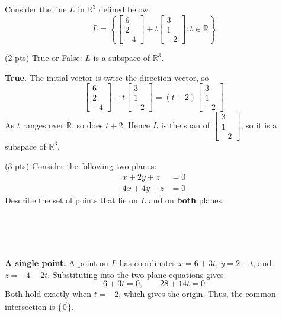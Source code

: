 \documentclass[11pt,twoside]{article}
\begin{document}
\begin{prob}[(5 pts)]
Consider the line $L$ in $\mathbb R^3$ defined below.
\[
L=\left\{\begin{bmatrix}6\\2\\-4\end{bmatrix}+t\begin{bmatrix}3\\1\\-2\end{bmatrix}:t\in\mathbb R\right\}
\]
\begin{subprob}(2 pts) True or False: $L$ is a subspace of $\mathbb R^3$.

\quad{}


\begin{solution}
\textbf{True.} The initial vector is twice the direction vector, so
\[
\begin{bmatrix}6\\2\\-4\end{bmatrix}+t\begin{bmatrix}3\\1\\-2\end{bmatrix}
=(t+2)\begin{bmatrix}3\\1\\-2\end{bmatrix}
\]
As $t$ ranges over $\mathbb R$, so does $t+2$. Hence $L$ is the span of $\begin{bmatrix}3\\1\\-2\end{bmatrix}$, so it is a subspace of $\mathbb R^3$.
\end{solution}
\end{subprob}

\begin{subprob}(3 pts) Consider the following two planes:
\[
\begin{aligned}
x+2y+z&=0 \\
4x+4y+z&=0
\end{aligned}
\]
Describe the set of points that lie on $L$ and on \textbf{both} planes.

\\[0.3em]
\\[0.3em]
\\[0.3em]


\begin{solution}
\textbf{A single point.} A point on $L$ has coordinates $x=6+3t$, $y=2+t$, and $z=-4-2t$. Substituting into the two plane equations gives
\[
6+3t=0,\qquad 28+14t=0
\]
Both hold exactly when $t=-2$, which gives the origin. Thus, the common intersection is $\{\vec 0\}$.
\end{solution}
\end{subprob}
\end{prob}\clearpage
\end{document}
